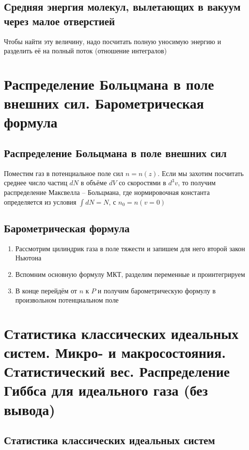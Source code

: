 \documentclass[a4paper, 14pt]{article}
\begin{document}
    \subsection{Средняя энергия молекул, вылетающих в вакуум через малое отверстией}
    
    Чтобы найти эту величину, надо посчитать полную уносимую энергию и разделить её на полный поток (отношение
    интегралов)
    
    \section{Распределение Больцмана в поле внешних сил.
    Барометрическая формула}
    
    \subsection{Распределение Больцмана в поле внешних сил}
    
    Поместим газ в потенциальное поле сил $n = n(z)$.
    Если мы захотим посчитать среднее число частиц $dN$ в объёме $dV$ со скоростями в $d^3 v$, то получим
    распределение Максвелла -- Больцмана, где нормировочная константа определяется из условия $\int dN = N$, с $n_0
    = n(v = 0)$
    
    \subsection{Барометрическая формула}
    
    \begin{enumerate}
        \item Рассмотрим цилиндрик газа в поле тяжести и запишем для него второй закон Ньютона
        \item Вспомним основную формулу МКТ, разделим переменные и проинтегрируем
        \item В конце перейдём от $n$ к $P$ и получим барометрическую формулу в произвольном потенциальном поле
    \end{enumerate}
    
    \section{Статистика классических идеальных систем.
    Микро- и макросостояния.
    Статистический вес.
    Распределение Гиббса для идеального газа (без вывода)}
    
    \subsection{Статистика классических идеальных систем}
    
\end{document}
